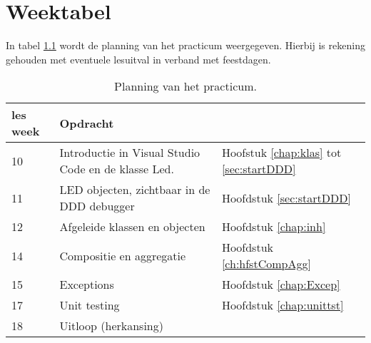 \chapter{Weektabel}

In tabel \ref{tabel:wkplan} wordt de planning van het practicum weergegeven. 
Hierbij is rekening gehouden met eventuele lesuitval in verband met feestdagen. 
\begin{table}[h!]
	\begin{tabular}{ | m{1.8em} | m{7cm} |l| } 
		\hline
les week &Opdracht &  \\ \hline
	10	& Introductie in Visual Studio Code en de klasse Led. & Hoofstuk \ref{chap:klas} tot \ref{sec:startDDD} \\ \hline
	11	&   LED objecten, zichtbaar in de DDD debugger &  Hoofdstuk \ref{sec:startDDD} \\ \hline
	12	&  Afgeleide klassen en objecten & Hoofdstuk \ref{chap:inh} \\ \hline
	14	&Compositie en aggregatie    & Hoofdstuk \ref{ch:hfstCompAgg} \\ \hline
	15	& Exceptions   & Hoofdstuk \ref{chap:Excep} \\ \hline
	17	&Unit testing  & Hoofdstuk \ref{chap:unittst} \\ \hline	
	18 &Uitloop (herkansing)&\\ \hline
	\end{tabular}  
    \caption{Planning van het practicum.}
    \label{tabel:wkplan}
\end{table}

